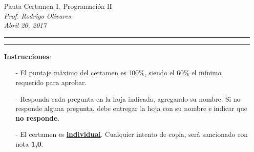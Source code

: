 \documentclass[10pt]{article}
\begin{document}
\begin{center}
    {\Large Pauta Certamen 1, Programaci\'on II} \\
    \emph{\small Prof. Rodrigo Olivares} \\
    \emph{\scriptsize Abril 20, 2017}
\end{center}
\vspace*{-35pt}
\begin{center}
    \rule{1\textwidth}{.3pt}
\end{center}
\vspace*{-42pt}
\begin{center}
    \rule{1\textwidth}{2pt}
\end{center}

\vspace*{-15pt}
{\small \textbf{Instrucciones}:}
\vspace*{-15pt}

{\scriptsize
\begin{itemize}
    \item[-] El puntaje m\'aximo del certamen es 100\%, siendo el 60\% el m\'inimo requerido para aprobar.
    \item[-] Responda cada pregunta en la hoja indicada, agregando su nombre. Si no responde alguna pregunta, debe entregar la hoja con su nombre e indicar que \textbf{no responde}.
    \item[-] El certamen es \underline{\textbf{individual}}. Cualquier intento de copia, ser\'a sancionado con nota \textbf{1,0}.
\end{itemize}
}
\vspace*{10pt}

\vspace*{-30pt}
\end{document}
